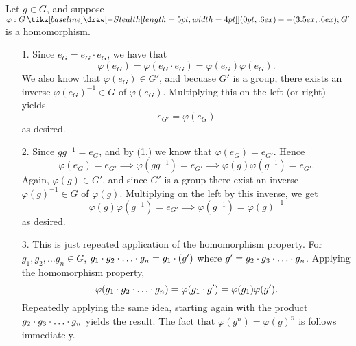 \documentclass[12pt,letterpaper]{algebra_book}
\renewcommand{\to}{\mathbin{\tikz[baseline] \draw[-{Stealth[length=5pt,width=4pt]}] (0pt,.6ex) -- (3.5ex,.6ex);}}
\renewcommand{\phi}{\varphi}
\theoremstyle{definition}
\begin{document}
    \begin{prf}
        Let $g \in G$, and suppose $\phi: G \to G'$ is a
        homomorphism. 
        
        \begin{itemize}
            \item[1.] Since $e_G = e_G \cdot e_G$, we have that 
            \[
                \phi(e_G) = \phi(e_G \cdot e_G) = \phi(e_G)\phi(e_G).
            \] 
            We also know that $\phi(e_G) \in G'$, and becuase $G'$ is a group,
            there exists an inverse $\phi(e_G)^{-1} \in G$ of
            $\phi(e_G)$. Multiplying this on the left (or right)
            yields
            \[
                e_{G'} = \phi(e_G)  
            \]
            as desired.
            \item[2.] Since $gg^{-1} = e_G$, and by (1.) we know that
            $\phi(e_G) = e_{G'}$. Hence 
            \[
                \phi(e_G) = e_{G'} \implies \phi(gg^{-1}) = e_{G'} 
                \implies \phi(g)\phi(g^{-1}) = e_{G'}.
            \]
            Again, $\phi(g) \in G'$, and since $G'$ is a group there
            exist an inverse $\phi(g)^{-1} \in G$ of $\phi(g)$.
            Multiplying on the left by this inverse, we get 
            \[
                \phi(g)\phi(g^{-1}) = e_{G'} \implies \phi(g^{-1}) = \phi(g)^{-1}
            \]
            as desired.

            \item[3.] This is just repeated application of the
            homomorphism property. 
            For $g_1, g_2, \dots g_n \in G$, $g_1 \cdot
            g_2 \cdot \hspace{0.01mm} \dots \hspace{0.01mm} \cdot g_n = g_1 \cdot (g')$ 
            where $g' = g_2
            \cdot g_3 \cdot \hspace{0.01mm} \dots \hspace{0.01mm} \cdot g_n$. Applying the
            homomorphism property, 
            \[
                \phi(g_1 \cdot g_2 \cdot \hspace{0.01mm} \dots \hspace{0.01mm} \cdot g_n) = \phi(g_1 \cdot g') = \phi(g_1) \phi(g').
            \]
            Repeatedly applying the same idea, starting again with the
            product $g_2 \cdot g_3 \cdot \hspace{0.01mm} \dots
            \hspace{0.01mm} \cdot g_n$ yields the result. The fact
            that $\phi(g^n) = \phi(g)^n$ is follows immediately.
        \end{itemize}
    \end{prf}
\end{document}
